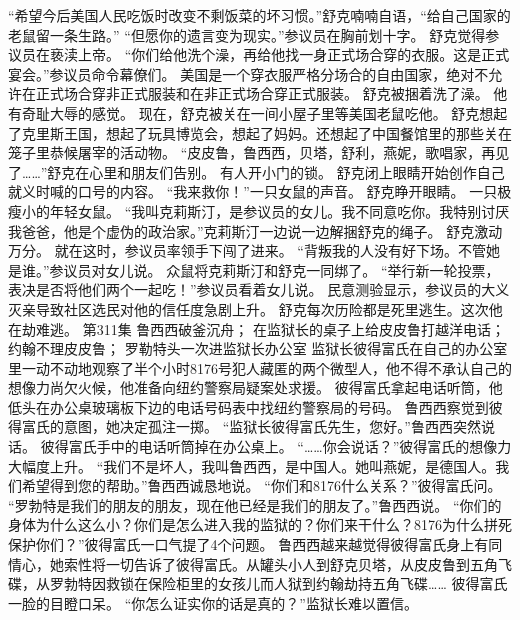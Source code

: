 \documentclass[a4paper,12pt,UTF8,twoside]{ctexbook}
\begin{document}
        “希望今后美国人民吃饭时改变不剩饭菜的坏习惯。”舒克喃喃自语，“给自己国家的老鼠留一条生路。”  
        “但愿你的遗言变为现实。”参议员在胸前划十字。  
        舒克觉得参议员在亵渎上帝。  
        “你们给他洗个澡，再给他找一身正式场合穿的衣服。这是正式宴会。”参议员命令幕僚们。  
        美国是一个穿衣服严格分场合的自由国家，绝对不允许在正式场合穿非正式服装和在非正式场合穿正式服装。  
        舒克被捆着洗了澡。  
        他有奇耻大辱的感觉。  
        现在，舒克被关在一间小屋子里等美国老鼠吃他。  
        舒克想起了克里斯王国，想起了玩具博览会，想起了妈妈。还想起了中国餐馆里的那些关在笼子里恭候屠宰的活动物。  
        “皮皮鲁，鲁西西，贝塔，舒利，燕妮，歌唱家，再见了……”舒克在心里和朋友们告别。  
        有人开小门的锁。  
        舒克闭上眼睛开始创作自己就义时喊的口号的内容。  
        “我来救你！”一只女鼠的声音。        
        舒克睁开眼睛。  
        一只极瘦小的年轻女鼠。  
        “我叫克莉斯汀，是参议员的女儿。我不同意吃你。我特别讨厌我爸爸，他是个虚伪的政治家。”克莉斯汀一边说一边解捆舒克的绳子。  
        舒克激动万分。  
        就在这时，参议员率领手下闯了进来。  
        “背叛我的人没有好下场。不管她是谁。”参议员对女儿说。  
        众鼠将克莉斯汀和舒克一同绑了。  
        “举行新一轮投票，表决是否将他们两个一起吃！”参议员看着女儿说。  
        民意测验显示，参议员的大义灭亲导致社区选民对他的信任度急剧上升。  
        舒克每次历险都是死里逃生。这次他在劫难逃。   第311集  
        鲁西西破釜沉舟；  
        在监狱长的桌子上给皮皮鲁打越洋电话；  
        约翰不理皮皮鲁；  
        罗勒特头一次进监狱长办公室    
        监狱长彼得富氏在自己的办公室里一动不动地观察了半个小时8176号犯人藏匿的两个微型人，他不得不承认自己的想像力尚欠火候，他准备向纽约警察局疑案处求援。  
        彼得富氏拿起电话听筒，他低头在办公桌玻璃板下边的电话号码表中找纽约警察局的号码。  
        鲁西西察觉到彼得富氏的意图，她决定孤注一掷。  
        “监狱长彼得富氏先生，您好。”鲁西西突然说话。        
        彼得富氏手中的电话听筒掉在办公桌上。  
        “……你会说话？”彼得富氏的想像力大幅度上升。  
        “我们不是坏人，我叫鲁西西，是中国人。她叫燕妮，是德国人。我们希望得到您的帮助。”鲁西西诚恳地说。  
        “你们和8176什么关系？”彼得富氏问。  
        “罗勃特是我们的朋友的朋友，现在他已经是我们的朋友了。”鲁西西说。  
        “你们的身体为什么这么小？你们是怎么进入我的监狱的？你们来干什么？8176为什么拼死保护你们？”彼得富氏一口气提了4个问题。  
        鲁西西越来越觉得彼得富氏身上有同情心，她索性将一切告诉了彼得富氏。从罐头小人到舒克贝塔，从皮皮鲁到五角飞碟，从罗勃特因救锁在保险柜里的女孩儿而人狱到约翰劫持五角飞碟……  
        彼得富氏一脸的目瞪口呆。  
        “你怎么证实你的话是真的？”监狱长难以置信。  
\end{document}
